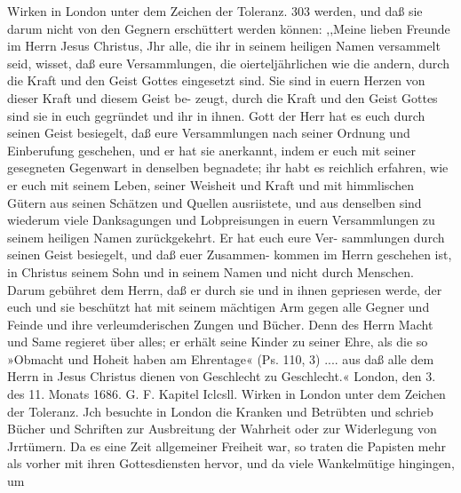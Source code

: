 Wirken in London unter dem Zeichen der Toleranz. 303
werden, und daß sie darum nicht von den Gegnern erschüttert
werden können:
,,Meine lieben Freunde im Herrn Jesus Christus,
Jhr alle, die ihr in seinem heiligen Namen versammelt seid,
wisset, daß eure Versammlungen, die oierteljährlichen wie die
andern, durch die Kraft und den Geist Gottes eingesetzt sind.
Sie sind in euern Herzen von dieser Kraft und diesem Geist be-
zeugt, durch die Kraft und den Geist Gottes sind sie in euch gegründet
und ihr in ihnen. Gott der Herr hat es euch durch seinen Geist
besiegelt, daß eure Versammlungen nach seiner Ordnung und
Einberufung geschehen, und er hat sie anerkannt, indem er euch
mit seiner gesegneten Gegenwart in denselben begnadete; ihr
habt es reichlich erfahren, wie er euch mit seinem Leben, seiner
Weisheit und Kraft und mit himmlischen Gütern aus seinen
Schätzen und Quellen ausriistete, und aus denselben sind wiederum
viele Danksagungen und Lobpreisungen in euern Versammlungen
zu seinem heiligen Namen zurückgekehrt. Er hat euch eure Ver-
sammlungen durch seinen Geist besiegelt, und daß euer Zusammen-
kommen im Herrn geschehen ist, in Christus seinem Sohn und in
seinem Namen und nicht durch Menschen. Darum gebühret dem
Herrn, daß er durch sie und in ihnen gepriesen werde, der euch
und sie beschützt hat mit seinem mächtigen Arm gegen alle Gegner
und Feinde und ihre verleumderischen Zungen und Bücher. Denn
des Herrn Macht und Same regieret über alles; er erhält seine
Kinder zu seiner Ehre, als die so »Obmacht und Hoheit haben
am Ehrentage« (Ps. 110, 3) .... aus daß alle dem Herrn in
Jesus Christus dienen von Geschlecht zu Geschlecht.«
London, den 3. des 11. Monats 1686. G. F.
Kapitel Iclcsll.
Wirken in London unter dem Zeichen der Toleranz.
Jch besuchte in London die Kranken und Betrübten und
schrieb Bücher und Schriften zur Ausbreitung der Wahrheit oder
zur Widerlegung von Jrrtümern. Da es eine Zeit allgemeiner
Freiheit war, so traten die Papisten mehr als vorher mit ihren
Gottesdiensten hervor, und da viele Wankelmütige hingingen, um


